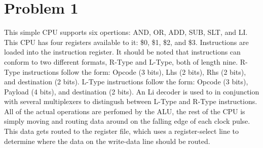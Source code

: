\documentclass{article}
\newenvironment{problem}[1]{
  \nobreak\section*{Problem #1}
}{}
\begin{document}
  \begin{problem}{1}
    This simple CPU supports six opertions: AND, OR, ADD, SUB, SLT, and LI.
    This CPU has four registers available to it: \$0, \$1, \$2, and \$3.
    Instructions are loaded into the instruction register.  It should be
    noted that instructions can conform to two different formats, R-Type and
    L-Type, both of length nine.  R-Type instructions follow the form: Opcode
    (3 bits), Lhs (2 bits), Rhs (2 bits), and destination (2 bits).  L-Type
    instructions follow the form: Opcode (3 bits), Payload (4 bits), and
    destination (2 bits).  An Li decoder is used to in conjunction with several
    multiplexers to distingush between L-Type and R-Type instructions.  All of
    the actual operations are perfomed by the ALU, the rest of the CPU is simply
    moving and routing data around on the falling edge of each clock pulse.
    This data gets routed to the register file, which uses a register-select
    line to determine where the data on the write-data line should be routed.

    \begin{center}
      
    \end{center}


\end{problem}
\end{document}
